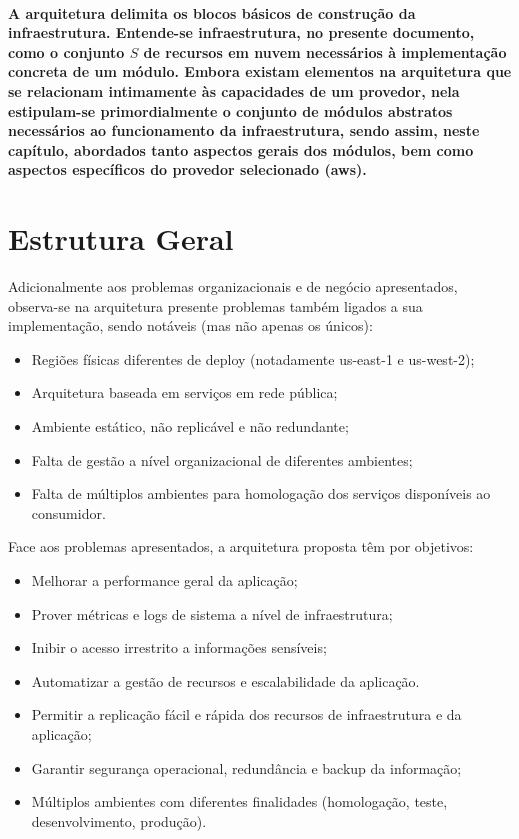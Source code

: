 \documentclass[12pt, a4paper]{report}
\begin{document}
\paragraph{
	A arquitetura delimita os blocos básicos de construção da infraestrutura. Entende-se infraestrutura, no presente documento, como o conjunto \(S\) de recursos em nuvem necessários à implementação concreta de um módulo. Embora existam elementos na arquitetura que se relacionam intimamente às capacidades de um provedor, nela estipulam-se primordialmente o conjunto de módulos abstratos necessários ao funcionamento da infraestrutura, sendo assim, neste capítulo, abordados tanto aspectos gerais dos módulos, bem como aspectos específicos do provedor selecionado (\acrshort{aws}).
}

\section{Estrutura Geral}

Adicionalmente aos problemas organizacionais e de negócio apresentados, observa-se na arquitetura presente problemas também ligados a sua implementação, sendo notáveis (mas não apenas os únicos):

\begin{itemize}
	\item Regiões físicas diferentes de deploy (notadamente us-east-1 e us-west-2);
	\item Arquitetura baseada em serviços em rede pública;
	\item Ambiente estático, não replicável e não redundante;
	\item Falta de gestão a nível organizacional de diferentes ambientes;
	\item Falta de múltiplos ambientes para homologação dos serviços disponíveis ao consumidor.
\end{itemize}

\newpage

Face aos problemas apresentados, a arquitetura proposta têm por objetivos:

\begin{itemize}
	\item Melhorar a performance geral da aplicação;
	\item Prover métricas e logs de sistema a nível de infraestrutura;
	\item Inibir o acesso irrestrito a informações sensíveis;
	\item Automatizar a gestão de recursos e escalabilidade da aplicação.
	\item Permitir a replicação fácil e rápida dos recursos de infraestrutura e da aplicação;
	\item Garantir segurança operacional, redundância e backup da informação;
	\item Múltiplos ambientes com diferentes finalidades (homologação, teste, desenvolvimento, produção).
\end{itemize}
\end{document}
